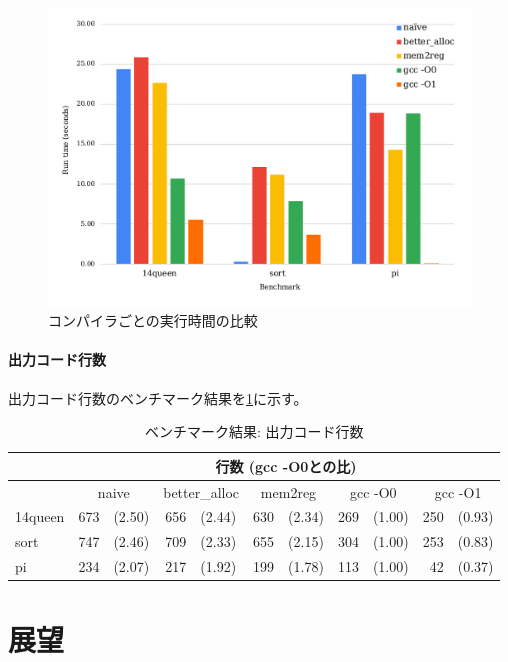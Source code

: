 \documentclass[uplatex,a4paper]{jsarticle}
\begin{document}
\begin{figure}[h]
  \centering
  \includegraphics[width=15cm]{graph1.pdf}
  \caption{コンパイラごとの実行時間の比較}
  \label{ccc_bench_run_graph}
\end{figure}

\clearpage
\paragraph{出力コード行数}

出力コード行数のベンチマーク結果を\cref{ccc_bench_loc}に示す。

\begin{table}[h!]
  \centering
  \begin{tabular}{l|rl|rl|rl|rl|rl}
    &\multicolumn{10}{c}{行数 (gcc -O0との比)} \\ \hline
    &\multicolumn{2}{c|}{naive}&\multicolumn{2}{c|}{better\_alloc}&\multicolumn{2}{c|}{mem2reg}&\multicolumn{2}{c|}{gcc -O0}&\multicolumn{2}{c}{gcc -O1} \\ \hline\hline
    14queen&673&(2.50)&656&(2.44)&630&(2.34)&269&(1.00)&250&(0.93) \\
    sort&747&(2.46)&709&(2.33)&655&(2.15)&304&(1.00)&253&(0.83) \\
    pi&234&(2.07)&217&(1.92)&199&(1.78)&113&(1.00)&42&(0.37) \\
  \end{tabular}
  \caption{ベンチマーク結果: 出力コード行数}
  \label{ccc_bench_loc}
\end{table}

\section{展望}
\end{document}
